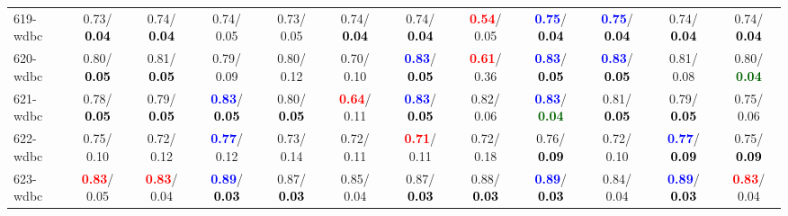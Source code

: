 \begin{table}[h]
\begin{center}
{\begin{tabular}{lc|c|c|c|c|c|c|c|c|c|c}
619-wdbc &   0.73/\textcolor{black}{\textbf{  0.04}} &   0.74/\textcolor{black}{\textbf{  0.04}} &   0.74/  0.05 &   0.73/  0.05 &   0.74/\textcolor{black}{\textbf{  0.04}} &   0.74/\textcolor{black}{\textbf{  0.04}} & \textcolor{red}{\textbf{  0.54}}/  0.05 & \textcolor{blue}{\textbf{  0.75}}/\textcolor{black}{\textbf{  0.04}} & \textcolor{blue}{\textbf{  0.75}}/\textcolor{black}{\textbf{  0.04}} &   0.74/\textcolor{black}{\textbf{  0.04}} &   0.74/\textcolor{black}{\textbf{  0.04}} \\
620-wdbc &   0.80/\textcolor{black}{\textbf{  0.05}} &   0.81/\textcolor{black}{\textbf{  0.05}} &   0.79/  0.09 &   0.80/  0.12 &   0.70/  0.10 & \textcolor{blue}{\textbf{  0.83}}/\textcolor{black}{\textbf{  0.05}} & \textcolor{red}{\textbf{  0.61}}/  0.36 & \textcolor{blue}{\textbf{  0.83}}/\textcolor{black}{\textbf{  0.05}} & \textcolor{blue}{\textbf{  0.83}}/\textcolor{black}{\textbf{  0.05}} &   0.81/  0.08 &   0.80/\textcolor{darkgreen}{\textbf{  0.04}} \\
621-wdbc &   0.78/\textcolor{black}{\textbf{  0.05}} &   0.79/\textcolor{black}{\textbf{  0.05}} & \textcolor{blue}{\textbf{  0.83}}/\textcolor{black}{\textbf{  0.05}} &   0.80/\textcolor{black}{\textbf{  0.05}} & \textcolor{red}{\textbf{  0.64}}/  0.11 & \textcolor{blue}{\textbf{  0.83}}/\textcolor{black}{\textbf{  0.05}} &   0.82/  0.06 & \textcolor{blue}{\textbf{  0.83}}/\textcolor{darkgreen}{\textbf{  0.04}} &   0.81/\textcolor{black}{\textbf{  0.05}} &   0.79/\textcolor{black}{\textbf{  0.05}} &   0.75/  0.06 \\
622-wdbc &   0.75/  0.10 &   0.72/  0.12 & \textcolor{blue}{\textbf{  0.77}}/  0.12 &   0.73/  0.14 &   0.72/  0.11 & \textcolor{red}{\textbf{  0.71}}/  0.11 &   0.72/  0.18 &   0.76/\textcolor{black}{\textbf{  0.09}} &   0.72/  0.10 & \textcolor{blue}{\textbf{  0.77}}/\textcolor{black}{\textbf{  0.09}} &   0.75/\textcolor{black}{\textbf{  0.09}} \\ \hline
623-wdbc & \textcolor{red}{\textbf{  0.83}}/  0.05 & \textcolor{red}{\textbf{  0.83}}/  0.04 & \textcolor{blue}{\textbf{  0.89}}/\textcolor{black}{\textbf{  0.03}} &   0.87/\textcolor{black}{\textbf{  0.03}} &   0.85/  0.04 &   0.87/\textcolor{black}{\textbf{  0.03}} &   0.88/\textcolor{black}{\textbf{  0.03}} & \textcolor{blue}{\textbf{  0.89}}/\textcolor{black}{\textbf{  0.03}} &   0.84/  0.04 & \textcolor{blue}{\textbf{  0.89}}/\textcolor{black}{\textbf{  0.03}} & \textcolor{red}{\textbf{  0.83}}/  0.04 \\

\end{tabular}}
\end{center}
\end{table}
